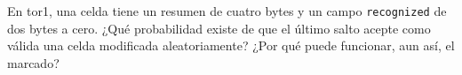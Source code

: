 \begin{esercizio}[3]\label{es:B-digest}
En tor1, una celda tiene un resumen de cuatro bytes y un campo \texttt{recognized} de dos bytes a cero. ¿Qué probabilidad existe de que el último salto acepte como válida una celda modificada aleatoriamente? ¿Por qué puede funcionar, aun así, el marcado?
\end{esercizio}
